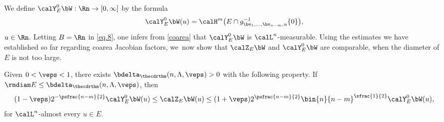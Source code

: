 \begin{Empty}
\label{def.Y0}
We define $\calY^0_E\bW: \Rn \to [0,\infty]$ by the formula\vspace*{-2pt}
\begin{equation}
\label{eq.14}
\calY_E^0 \bW(u) = \calH^m \bigl(E \cap g_{\bv_1,\ldots,\bv_{n-m},u}^{-1}\{0\}\bigr),
\end{equation}
$u \in \Rn$.
Letting $B = \Rn$ in \eqref{eq.8}, one infers from \ref{coarea} that $\calY^0_E\bW$ is $\calL^n$-measurable.
Using the estimates we have established so far regarding coarea Jacobian factors, we~now show that $\calZ_E \bW$ and $\calY_E^0 \bW$ are comparable, when the diameter of $E$ is not too large.
\end{Empty}

\begin{Proposition}
\label{Z.1}
Given $0 < \veps < 1$, there exists $\bdelta_{\thecdrthm}(n,\Lambda,\veps) > 0$ with the following property. If $\rmdiam E \leq \bdelta_{\thecdrthm}(n,\Lambda,\veps)$, then\vspace*{-5pt}\enlargethispage{.5\baselineskip}
\begin{equation*}
(1-\veps) 2^{-\psfrac{n-m}{2}} \calY^0_E \bW(u) \leq \calZ_E \bW(u) \leq (1+\veps) 2^{\psfrac{n-m}{2}} \bin{n}{n-m}^{\sfrac{1}{2}}\calY^0_E \bW(u),
\end{equation*}
for $\calL^n$-almost every $u \in E$.
\end{Proposition}

